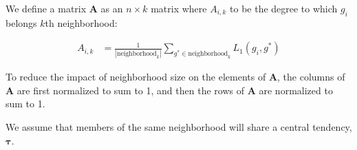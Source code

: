         We define a matrix $\mathbf{A}$ as an $n \times k$ matrix where
        $A_{i, k}$ to be the degree to which $g_i$ belongs $k$th neighborhood:

        \begin{align}
            A_{i, k} &= \frac{1}{|\text{neighborhood}_k|}\sum_{
                g^* \in \text{neighborhood}_k}{L_1(g_i, g^*)}
        \end{align}


        To reduce the impact of neighborhood size on the elements
        of $\mathbf{A}$, the columns of $\mathbf{A}$ are first
        normalized to sum to 1, and then the rows of $\mathbf{A}$
        are normalized to sum to 1.

        We assume that members of the same neighborhood will
        share a central tendency, $\mathbf{\tau}$.
